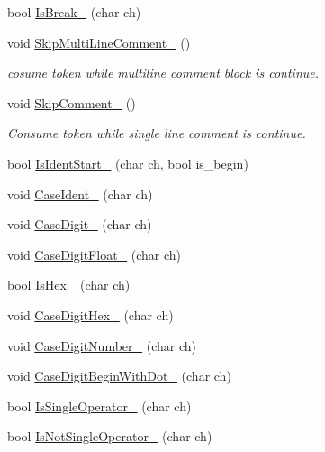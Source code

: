 \begin{DoxyCompactItemize}
bool \hyperlink{classmocha_1_1_scanner_1_1_internal_scanner_afc3f5a097f50c6e913d3a8e0786e5d0d}{IsBreak\_\-} (char ch)
\item 
void \hyperlink{classmocha_1_1_scanner_1_1_internal_scanner_a8a01f045575bf7d49a0dd317c191f3c4}{SkipMultiLineComment\_\-} ()
\begin{DoxyCompactList}\small\item\em cosume token while multiline comment block is continue. \end{DoxyCompactList}\item 
void \hyperlink{classmocha_1_1_scanner_1_1_internal_scanner_a0defcbf7cc6bdea1c7a72e33a1e70c3d}{SkipComment\_\-} ()
\begin{DoxyCompactList}\small\item\em Consume token while single line comment is continue. \end{DoxyCompactList}\item 
bool \hyperlink{classmocha_1_1_scanner_1_1_internal_scanner_a0b1aefc0d76880debe4d74c054cff2d1}{IsIdentStart\_\-} (char ch, bool is\_\-begin)
\item 
void \hyperlink{classmocha_1_1_scanner_1_1_internal_scanner_a380617bf530147914e4bf751fabc5a3b}{CaseIdent\_\-} (char ch)
\item 
void \hyperlink{classmocha_1_1_scanner_1_1_internal_scanner_a7dd6bbd264b103cf4738e358cf334bd9}{CaseDigit\_\-} (char ch)
\item 
void \hyperlink{classmocha_1_1_scanner_1_1_internal_scanner_ab09016d78ddd8792edc14234e711a993}{CaseDigitFloat\_\-} (char ch)
\item 
bool \hyperlink{classmocha_1_1_scanner_1_1_internal_scanner_a6fdb4e3b015dd5445cd5ebc66f0b527f}{IsHex\_\-} (char ch)
\item 
void \hyperlink{classmocha_1_1_scanner_1_1_internal_scanner_ad6ce60080f76344e507ae883f9ed1dbb}{CaseDigitHex\_\-} (char ch)
\item 
void \hyperlink{classmocha_1_1_scanner_1_1_internal_scanner_ac87d975bd849410cfa8c385b771388f3}{CaseDigitNumber\_\-} (char ch)
\item 
void \hyperlink{classmocha_1_1_scanner_1_1_internal_scanner_a43bc94b502671bad6df9a6dc6fb27a8a}{CaseDigitBeginWithDot\_\-} (char ch)
\item 
bool \hyperlink{classmocha_1_1_scanner_1_1_internal_scanner_a803d1fa7a28a52c88ace17df824bdfc3}{IsSingleOperator\_\-} (char ch)
\item 
bool \hyperlink{classmocha_1_1_scanner_1_1_internal_scanner_aaa164da1da218b5a2399fbeca95dac4e}{IsNotSingleOperator\_\-} (char ch)

\end{DoxyCompactItemize}
